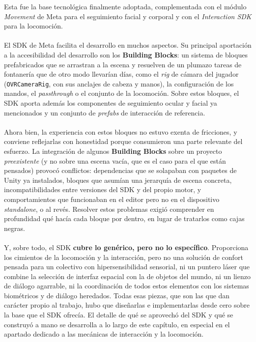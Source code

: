 \documentclass[12pt,twoside,titlepage]{report}
\begin{document}
Esta fue la base tecnológica finalmente adoptada, complementada con el módulo \textit{Movement} de Meta para el seguimiento facial y corporal y con el \textit{Interaction SDK} para la locomoción.\\
\\
El SDK de Meta facilita el desarrollo en muchos aspectos.
Su principal aportación a la accesibilidad del desarrollo son los \textbf{Building Blocks}: un sistema de bloques prefabricados que se arrastran a la escena y resuelven de un plumazo tareas de fontanería que de otro modo llevarían días, como el \textit{rig} de cámara del jugador (\texttt{OVRCameraRig}, con sus anclajes de cabeza y manos), la configuración de los mandos, el \textit{passthrough} o el conjunto de la locomoción.
Sobre estos bloques, el SDK aporta además los componentes de seguimiento ocular y facial ya mencionados y un conjunto de \textit{prefabs} de interacción de referencia.\\
\\
Ahora bien, la experiencia con estos bloques no estuvo exenta de fricciones, y conviene reflejarlas con honestidad porque consumieron una parte relevante del esfuerzo.
La integración de algunos \textbf{Building Blocks} sobre un proyecto \textit{preexistente} (y no sobre una escena vacía, que es el caso para el que están pensados) provocó conflictos: dependencias que se solapaban con paquetes de Unity ya instalados, bloques que asumían una jerarquía de escena concreta, incompatibilidades entre versiones del SDK y del propio motor, y comportamientos que funcionaban en el editor pero no en el dispositivo \textit{standalone}, o al revés.
Resolver estos problemas exigió comprender en profundidad qué hacía cada bloque por dentro, en lugar de tratarlos como cajas negras.\\
\\
Y, sobre todo, el SDK \textbf{cubre lo genérico, pero no lo específico}.
Proporciona los cimientos de la locomoción y la interacción, pero no una solución de confort pensada para un colectivo con hipersensibilidad sensorial, ni un puntero láser que combine la selección de interfaz espacial con la de objetos del mundo, ni un lienzo de diálogo agarrable, ni la coordinación de todos estos elementos con los sistemas biométricos y de diálogo heredados.
Todas esas piezas, que son las que dan carácter propio al trabajo, hubo que diseñarlas e implementarlas desde cero sobre la base que el SDK ofrecía.
El detalle de qué se aprovechó del SDK y qué se construyó a mano se desarrolla a lo largo de este capítulo, en especial en el apartado dedicado a las mecánicas de interacción y la locomoción.
\end{document}
